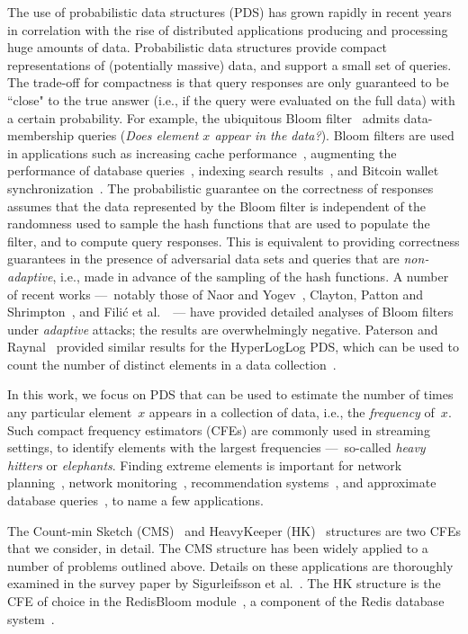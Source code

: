 The use of probabilistic data structures (PDS) has grown rapidly in recent years in correlation with the rise of distributed applications producing and processing huge amounts of data. Probabilistic data structures provide compact representations of (potentially massive) data, and support a small set of queries.  The trade-off for compactness is that query responses are only guaranteed to be ``close" to the true answer (i.e., if the query were evaluated on the full data) with a certain probability. For example, the ubiquitous Bloom filter~\cite{bloom1970space} admits data-membership queries (\emph{Does element $x$ appear in the data?}).  Bloom filters are used in applications such as increasing cache performance~\cite{maggs2015}, augmenting the performance of database queries~\cite{dean2006}, indexing search results~\cite{goodwin2017bitfunnel}, and Bitcoin wallet synchronization~\cite{bip-0037}.
The probabilistic guarantee on the correctness of responses assumes that the data represented by the Bloom filter is independent of the randomness used to sample the hash functions that are used to populate the filter, and to compute query responses.  This is equivalent to providing correctness guarantees in the presence of adversarial data sets and queries that are \emph{non-adaptive}, i.e., made in advance of the sampling of the hash functions.  
A number of recent works ---~notably those of Naor and Yogev~\cite{naor2015bloom}, Clayton, Patton and Shrimpton~\cite{clayton2019}, and Fili\'{c} et al.~\cite{_CCS:FPUV22}~--- have provided detailed analyses of Bloom filters under \emph{adaptive} attacks; the results are overwhelmingly negative. Paterson and Raynal~\cite{paterson2021} provided similar results for the HyperLogLog PDS, which can be used to count the number of distinct elements in a data collection~\cite{flajolet2007hyperloglog}.

In this work, we focus on PDS that can be used to estimate the number of times any particular element~$x$ appears in a collection of data, i.e., the \emph{frequency} of~$x$. Such compact frequency estimators (CFEs) are commonly used in streaming settings, to identify elements with the largest frequencies ---~so-called \emph{heavy hitters} or \emph{elephants}.  Finding extreme elements is important for network planning~\cite{feldmann00}, network monitoring~\cite{lakhina04}, recommendation systems~\cite{melis2015efficient}, and approximate database queries~\cite{redisbloom}, to name a few applications.  

The Count-min Sketch (CMS)~\cite{cormode2005improved} and HeavyKeeper (HK)~\cite{yang2019heavykeeper} structures are two CFEs that we consider, in detail.
The CMS structure has been widely applied to a number of problems outlined above. Details on these applications are thoroughly examined in the survey paper by Sigurleifsson et al.~\cite{sigurleifsson2019overview}. 
The HK structure is the CFE of choice in the RedisBloom module~\cite{redisbloom}, a component of the Redis database system~\cite{redis}.  

